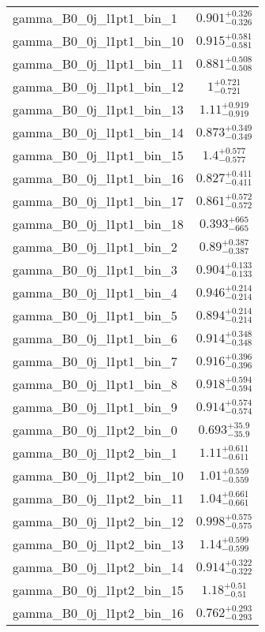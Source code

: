 \begin{tabular}{|l|c|}
gamma\_B0\_0j\_l1pt1\_bin\_1 & $0.901^{+0.326}_{-0.326}$ \\
gamma\_B0\_0j\_l1pt1\_bin\_10 & $0.915^{+0.581}_{-0.581}$ \\
gamma\_B0\_0j\_l1pt1\_bin\_11 & $0.881^{+0.508}_{-0.508}$ \\
gamma\_B0\_0j\_l1pt1\_bin\_12 & $1^{+0.721}_{-0.721}$ \\
gamma\_B0\_0j\_l1pt1\_bin\_13 & $1.11^{+0.919}_{-0.919}$ \\
gamma\_B0\_0j\_l1pt1\_bin\_14 & $0.873^{+0.349}_{-0.349}$ \\
gamma\_B0\_0j\_l1pt1\_bin\_15 & $1.4^{+0.577}_{-0.577}$ \\
gamma\_B0\_0j\_l1pt1\_bin\_16 & $0.827^{+0.411}_{-0.411}$ \\
gamma\_B0\_0j\_l1pt1\_bin\_17 & $0.861^{+0.572}_{-0.572}$ \\
gamma\_B0\_0j\_l1pt1\_bin\_18 & $0.393^{+665}_{-665}$ \\
gamma\_B0\_0j\_l1pt1\_bin\_2 & $0.89^{+0.387}_{-0.387}$ \\
gamma\_B0\_0j\_l1pt1\_bin\_3 & $0.904^{+0.133}_{-0.133}$ \\
gamma\_B0\_0j\_l1pt1\_bin\_4 & $0.946^{+0.214}_{-0.214}$ \\
gamma\_B0\_0j\_l1pt1\_bin\_5 & $0.894^{+0.214}_{-0.214}$ \\
gamma\_B0\_0j\_l1pt1\_bin\_6 & $0.914^{+0.348}_{-0.348}$ \\
gamma\_B0\_0j\_l1pt1\_bin\_7 & $0.916^{+0.396}_{-0.396}$ \\
gamma\_B0\_0j\_l1pt1\_bin\_8 & $0.918^{+0.594}_{-0.594}$ \\
gamma\_B0\_0j\_l1pt1\_bin\_9 & $0.914^{+0.574}_{-0.574}$ \\
gamma\_B0\_0j\_l1pt2\_bin\_0 & $0.693^{+35.9}_{-35.9}$ \\
gamma\_B0\_0j\_l1pt2\_bin\_1 & $1.11^{+0.611}_{-0.611}$ \\
gamma\_B0\_0j\_l1pt2\_bin\_10 & $1.01^{+0.559}_{-0.559}$ \\
gamma\_B0\_0j\_l1pt2\_bin\_11 & $1.04^{+0.661}_{-0.661}$ \\
gamma\_B0\_0j\_l1pt2\_bin\_12 & $0.998^{+0.575}_{-0.575}$ \\
gamma\_B0\_0j\_l1pt2\_bin\_13 & $1.14^{+0.599}_{-0.599}$ \\
gamma\_B0\_0j\_l1pt2\_bin\_14 & $0.914^{+0.322}_{-0.322}$ \\
gamma\_B0\_0j\_l1pt2\_bin\_15 & $1.18^{+0.51}_{-0.51}$ \\
gamma\_B0\_0j\_l1pt2\_bin\_16 & $0.762^{+0.293}_{-0.293}$ \\

\end{tabular}
